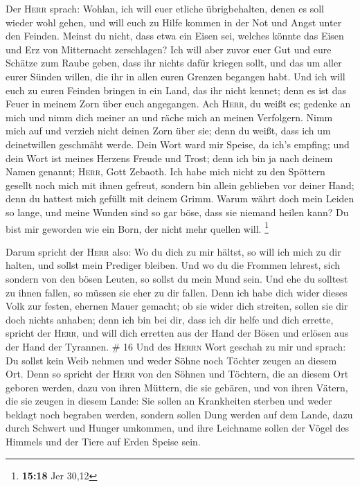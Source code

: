  Der \textsc{Herr} sprach: Wohlan, ich will euer etliche
übrigbehalten, denen es soll wieder wohl gehen, und will euch zu Hilfe
kommen in der Not und Angst unter den Feinden.  Meinst du
nicht, dass etwa ein Eisen sei, welches könnte das Eisen und Erz von
Mitternacht zerschlagen?  Ich will aber zuvor euer Gut
und eure Schätze zum Raube geben, dass ihr nichts dafür kriegen sollt,
und das um aller eurer Sünden willen, die ihr in allen euren Grenzen
begangen habt.  Und ich will euch zu euren Feinden
bringen in ein Land, das ihr nicht kennet; denn es ist das Feuer in
meinem Zorn über euch angegangen.  Ach \textsc{Herr}, du
weißt es; gedenke an mich und nimm dich meiner an und räche mich an
meinen Verfolgern. Nimm mich auf und verzieh nicht deinen Zorn über sie;
denn du weißt, dass ich um deinetwillen geschmäht werde. 
Dein Wort ward mir Speise, da ich's empfing; und dein Wort ist meines
Herzens Freude und Trost; denn ich bin ja nach deinem Namen genannt;
\textsc{Herr}, Gott Zebaoth.  Ich habe mich nicht zu den
Spöttern gesellt noch mich mit ihnen gefreut, sondern bin allein
geblieben vor deiner Hand; denn du hattest mich gefüllt mit deinem
Grimm.  Warum währt doch mein Leiden so lange, und meine
Wunden sind so gar böse, dass sie niemand heilen kann? Du bist mir
geworden wie ein Born, der nicht mehr quellen will. \footnote{\textbf{15:18}
  Jer 30,12}

 Darum spricht der \textsc{Herr} also: Wo du dich zu mir
hältst, so will ich mich zu dir halten, und sollst mein Prediger
bleiben. Und wo du die Frommen lehrest, sich sondern von den bösen
Leuten, so sollst du mein Mund sein. Und ehe du solltest zu ihnen
fallen, so müssen sie eher zu dir fallen.  Denn ich habe
dich wider dieses Volk zur festen, ehernen Mauer gemacht; ob sie wider
dich streiten, sollen sie dir doch nichts anhaben; denn ich bin bei dir,
dass ich dir helfe und dich errette, spricht der \textsc{Herr},
 und will dich erretten aus der Hand der Bösen und
erlösen aus der Hand der Tyrannen. \# 16  Und des
\textsc{Herrn} Wort geschah zu mir und sprach:  Du sollst
kein Weib nehmen und weder Söhne noch Töchter zeugen an diesem Ort.
 Denn so spricht der \textsc{Herr} von den Söhnen und
Töchtern, die an diesem Ort geboren werden, dazu von ihren Müttern, die
sie gebären, und von ihren Vätern, die sie zeugen in diesem Lande:
 Sie sollen an Krankheiten sterben und weder beklagt noch
begraben werden, sondern sollen Dung werden auf dem Lande, dazu durch
Schwert und Hunger umkommen, und ihre Leichname sollen der Vögel des
Himmels und der Tiere auf Erden Speise sein.

